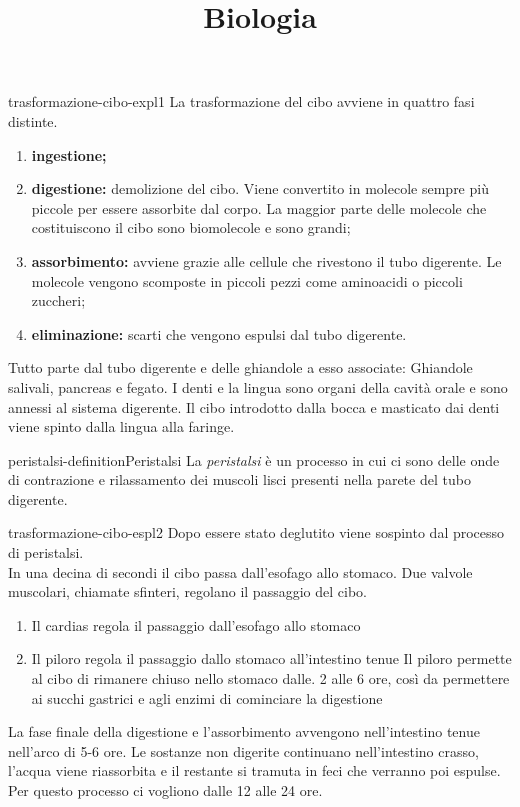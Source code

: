 \documentclass[preview]{standalone}
\begin{document}
\title{Biologia}
\genpage

\begin{snippet}{trasformazione-cibo-expl1}
    La trasformazione del cibo avviene in quattro fasi distinte.
    \begin{enumerate}
        \item \textbf{ingestione;}
        \item \textbf{digestione:} demolizione del cibo. Viene convertito in molecole sempre più piccole per essere
        assorbite dal corpo. La maggior parte delle molecole che costituiscono il cibo sono
        biomolecole e sono grandi;
        \item \textbf{assorbimento:} avviene grazie alle cellule che rivestono il tubo digerente.
        Le molecole vengono scomposte in piccoli pezzi come aminoacidi o piccoli zuccheri;
        \item \textbf{eliminazione:} scarti che vengono
        espulsi dal tubo digerente.
    \end{enumerate}

    Tutto parte dal tubo digerente e delle ghiandole a esso associate:
    Ghiandole salivali, pancreas e fegato. I denti e la lingua sono organi
    della cavità orale e sono annessi al sistema digerente.
    Il cibo introdotto dalla bocca e masticato dai denti viene spinto dalla
    lingua alla faringe.
\end{snippet}

\begin{snippetdefinition}{peristalsi-definition}{Peristalsi}
    La \textit{peristalsi} è un processo in cui ci sono delle onde di
    contrazione e rilassamento dei muscoli lisci presenti nella
    parete del tubo digerente.
\end{snippetdefinition}

\begin{snippet}{trasformazione-cibo-espl2}
    Dopo essere stato deglutito viene sospinto dal
    processo di peristalsi.
    \\
    In una decina di secondi il cibo passa dall'esofago allo stomaco. Due
    valvole muscolari, chiamate sfinteri, regolano il passaggio del cibo.
    
    \begin{enumerate}
        \item Il cardias regola il passaggio dall'esofago allo stomaco
        \item Il piloro regola il passaggio dallo stomaco all'intestino tenue
        Il piloro permette al cibo di rimanere chiuso nello stomaco dalle.
        2 alle 6 ore, così da permettere ai succhi gastrici e agli enzimi
        di cominciare la digestione
    \end{enumerate}
    
    La fase finale della digestione e l'assorbimento avvengono
    nell'intestino tenue nell'arco di 5-6 ore. Le sostanze non digerite
    continuano nell'intestino crasso, l'acqua viene riassorbita e il restante
    si tramuta in feci che verranno poi espulse. Per questo processo ci
    vogliono dalle 12 alle 24 ore.
\end{snippet}
\end{document}
